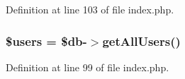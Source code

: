 Definition at line 103 of file index.\-php.

\hypertarget{cloud_messaging_2index_8php_a28005d22fa7ef2dfe215ad886b497d9c}{
\subsubsection[{\$users}]{\setlength{\rightskip}{0pt plus 5cm}\$users = \$db-\/$>$get\-All\-Users()}}\label{cloud_messaging_2index_8php_a28005d22fa7ef2dfe215ad886b497d9c}


Definition at line 99 of file index.\-php.

